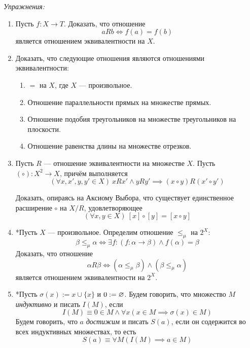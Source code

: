 \vspace{1em}
{\it Упражнения:}
\begin{enumerate}
  \item{}Пусть $f:X\to T$. Доказать, что отношение\label{ex:fn_equiv}
  \[
    aRb\iff f(a)=f(b)
  \]
  является отношением эквивалентности на $X$.

  \item{}Доказать, что следующие отношения являются отношениями эквивалентности:
  \begin{enumerate}
    \item{}$=$ на $X$, где $X$ --- произвольное.
    \item{}Отношение параллельности прямых на множестве прямых.
    \item{}Отношение подобия треугольников на множестве треугольников
    на плоскости.
    \item{}Отношение равенства длины на множестве отрезков.
  \end{enumerate}

  \item{}Пусть $R$ --- отношение эквивалентности на множестве $X$.
  Пусть $(\circ):X^{2}\to X$, причём выполняется
  \[
    (\forall x,x',y,y'\in X)~xRx'\land yRy'\implies (x\circ y)R(x'\circ y')
  \]

  Доказать, опираясь на Аксиому Выбора,
  что существует единственное расширение $\circ$ на $X/R$, удовлетворяющее
  \[
    (\forall x,y\in X)~[x]\circ[y]=[x\circ y]
  \]

  \item{}*Пусть $X$ --- произвольное.
  Определим отношение $\leq_{\mu}$ на $2^{X}$:
  \[
    \beta\leq_{\mu}\alpha\iff \exists f:(f:\alpha\to\beta)\land f(\alpha)=\beta
  \]
  Доказать, что отношение
  \[
    \alpha R\beta\iff (\alpha\leq_{\mu}\beta)\land (\beta\leq_{\mu}\alpha)
  \]
  является отношением эквивалентности на $2^{X}$.

  \item{}*Пусть $\sigma(x):=x\cup\{x\}$ и $0:=\varnothing$. Будем говорить, что
  множество $M$ {\it индуктивно} и писать $I(M)$, если
  \[
    I(M)\equiv 0\in M\land \forall x(x\in M\implies \sigma(x)\in M)
  \]
  Будем говорить, что $a$ {\it достижим}
   и писать $S(a)$,
  если он содержится во всех индуктивных множествах, то есть
  \[
    S(a)\equiv \forall M(I(M)\implies a\in M)
  \]


\end{enumerate}
